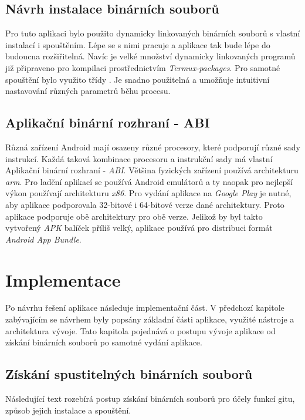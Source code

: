 \section{Návrh instalace binárních souborů}
Pro tuto aplikaci bylo použito dynamicky linkovaných binárních souborů s vlastní instalací i spouštěním. Lépe se s nimi pracuje a aplikace tak bude lépe do budoucna rozšiřitelná. Navíc je velké množství dynamicky linkovaných programů již připraveno pro kompilaci prostřednictvím \emph{Termux-packages}. Pro samotné spouštění bylo využito třídy . Je snadno použitelná a umožňuje intuitivní nastavování různých parametrů běhu procesu.

\section{Aplikační binární rozhraní - ABI}
Různá zařízení Android mají osazeny různé procesory, které podporují různé sady instrukcí. Každá taková kombinace procesoru a instrukční sady má vlastní Aplikační binární rozhraní - \emph{ABI}. Většina fyzických zařízení používá architekturu \emph{arm}. Pro ladění aplikací se používá Android emulátorů a ty naopak pro nejlepší výkon používají architekturu \emph{x86}. Pro vydání aplikace na \emph{Google Play} je nutné, aby aplikace podporovala 32-bitové i 64-bitové verze dané architektury. Proto aplikace podporuje obě architektury pro obě verze. Jelikož by byl takto vytvořený \emph{APK} balíček příliš velký, aplikace používá pro distribuci formát \emph{Android App Bundle}.
    
\chapter{Implementace}
Po návrhu řešení aplikace následuje implementační část. V předchozí kapitole zabývajícím se návrhem byly popsány základní části aplikace, využité nástroje a architektura vývoje. Tato kapitola pojednává o postupu vývoje aplikace od získání binárních souborů po samotné vydání aplikace.

\section{Získání spustitelných binárních souborů}
Následující text rozebírá postup získání binárních souborů pro účely funkcí gitu, způsob jejich instalace a spouštění.

